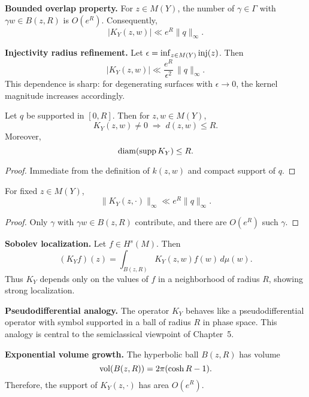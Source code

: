 \noindent\textbf{Bounded overlap property.}
For $z\in M(Y)$, the number of $\gamma\in\Gamma$ with $\gamma w\in B(z,R)$ is $O(e^{R})$.
Consequently,
\[
  |K_{Y}(z,w)| \ll e^{R}\|q\|_{\infty}.
\]

\medskip

\noindent\textbf{Injectivity radius refinement.}
Let $\epsilon = \inf_{z\in M(Y)}\operatorname{inj}(z)$.
Then
\[
  |K_{Y}(z,w)| \ll \frac{e^{R}}{\epsilon^{2}}\,\|q\|_{\infty}.
\]
This dependence is sharp: for degenerating surfaces with $\epsilon\to 0$,
the kernel magnitude increases accordingly.

\medskip

\begin{lemma}\label{lem:support-bound}
Let $q$ be supported in $[0,R]$. Then for $z,w\in M(Y)$,
\[
  K_{Y}(z,w)\neq 0 \;\Rightarrow\; d(z,w)\le R.
\]
Moreover,
\[
  \operatorname{diam}(\operatorname{supp} K_{Y})\le R.
\]
\end{lemma}

\begin{proof}
Immediate from the definition of $k(z,w)$ and compact support of $q$.
\end{proof}

\medskip

\begin{lemma}\label{lem:local-Linfty}
For fixed $z\in M(Y)$,
\[
  \|K_{Y}(z,\cdot)\|_{\infty} \ll e^{R}\|q\|_{\infty}.
\]
\end{lemma}

\begin{proof}
Only $\gamma$ with $\gamma w\in B(z,R)$ contribute,
and there are $O(e^{R})$ such $\gamma$.
\end{proof}

\medskip

\noindent\textbf{Sobolev localization.}
Let $f\in H^{s}(M)$.
Then
\[
  (K_{Y}f)(z) = \int_{B(z,R)} K_{Y}(z,w)f(w)\,d\mu(w).
\]
Thus $K_{Y}$ depends only on the values of $f$ in a neighborhood of radius $R$,
showing strong localization.

\medskip

\noindent\textbf{Pseudodifferential analogy.}
The operator $K_{Y}$ behaves like a pseudodifferential operator
with symbol supported in a ball of radius $R$ in phase space.
This analogy is central to the semiclassical viewpoint of Chapter~5.

\medskip

\noindent\textbf{Exponential volume growth.}
The hyperbolic ball $B(z,R)$ has volume
\[
  \operatorname{vol}(B(z,R)) = 2\pi(\cosh R - 1).
\]
Therefore, the support of $K_{Y}(z,\cdot)$ has area $O(e^{R})$.

